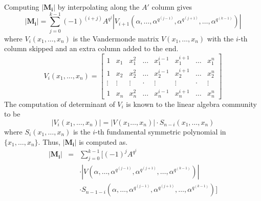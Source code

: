 Computing $|\mathbf{M_i}|$ by interpolating along the $A'$ column gives
\begin{equation}
|\mathbf{M_i}|=\sum\limits_{j=0}^{k-1}(-1)^{(i+j)}A^{q^j}
|V_{i+1}(\alpha,\dots,\alpha^{q^(j-1)},\alpha^{q^(j+1)},\dots,\alpha^{q^(k-1)})|
\end{equation}
where $V_i(x_1,\dots,x_n)$ is the Vandermonde matrix $V(x_1,\dots,x_n)$ with the
$i$-th column skipped and an extra column added to the end.
\begin{equation}
V_i(x_1,\dots,x_n) 
=
\begin{bmatrix}
1 & x_1 & x_1^2  & \dots  & x_1^{i-1} & x_1^{i+1} & \dots & x_1^n \\
1 & x_2 & x_2^2  & \dots  & x_2^{i-1} & x_2^{i+1} & \dots & x_2^n \\
\vdots & \vdots  & \vdots & \cdot  & \vdots    & \vdots    & \cdot & \vdots    \\
1 & x_n & x_n^2  & \dots  & x_n^{i-1} & x_n^{i+1} & \dots & x_n^n
\end{bmatrix} 
\end{equation}
The computation of determinant of $V_i$ is known to the linear algebra community to
be
\begin{equation}
|V_i(x_1,\dots,x_n)| = |V(x_1\dots,x_n)|\cdot S_{n-i}(x_1,\dots,x_n)
\end{equation}
where $S_i(x_1,\dots,x_n)$ is the $i$-th fundamental symmetric polynomial in $\{x_1,\dots,x_n\}$.
Thus, $|\mathbf{M_i}|$ is computed as.
\begin{eqnarray}
|\mathbf{M_i}| &=& \sum\limits_{j=0}^{k-1}[(-1)^{j}A^{q^j} \nonumber \\
& & \cdot |V(\alpha,\dots,\alpha^{q^(j-1)},\alpha^{q^(j+1)},\dots,\alpha^{q^(k-1)})| \nonumber \\
& & \cdot S_{n-1-i}(\alpha,\dots,\alpha^{q^(j-1)},\alpha^{q^(j+1)},\dots,\alpha^{q^(k-1)})] \label{eqn:MireducedFq}
\end{eqnarray}

